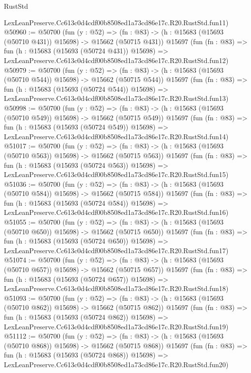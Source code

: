 \begin{lexlean}{RustStd}
\begin{coremodule}
    LexLeanPreserve.Cc613c0d4cdf00b8508ed1a73cd86e17c.R20.RustStd.fun11)
@50960 := @50700
    (fun (y : @52) =>
    (fn : @83) -> (h : @15683 (@15693 (@50710 @431)) @15698) -> @15662 (@50715 @431))
    @15697
    (fun (fn : @83) =>
    fun (h : @15683 (@15693 (@50724 @431)) @15698) =>
    LexLeanPreserve.Cc613c0d4cdf00b8508ed1a73cd86e17c.R20.RustStd.fun12)
@50979 := @50700
    (fun (y : @52) =>
    (fn : @83) -> (h : @15683 (@15693 (@50710 @544)) @15698) -> @15662 (@50715 @544))
    @15697
    (fun (fn : @83) =>
    fun (h : @15683 (@15693 (@50724 @544)) @15698) =>
    LexLeanPreserve.Cc613c0d4cdf00b8508ed1a73cd86e17c.R20.RustStd.fun13)
@50998 := @50700
    (fun (y : @52) =>
    (fn : @83) -> (h : @15683 (@15693 (@50710 @549)) @15698) -> @15662 (@50715 @549))
    @15697
    (fun (fn : @83) =>
    fun (h : @15683 (@15693 (@50724 @549)) @15698) =>
    LexLeanPreserve.Cc613c0d4cdf00b8508ed1a73cd86e17c.R20.RustStd.fun14)
@51017 := @50700
    (fun (y : @52) =>
    (fn : @83) -> (h : @15683 (@15693 (@50710 @563)) @15698) -> @15662 (@50715 @563))
    @15697
    (fun (fn : @83) =>
    fun (h : @15683 (@15693 (@50724 @563)) @15698) =>
    LexLeanPreserve.Cc613c0d4cdf00b8508ed1a73cd86e17c.R20.RustStd.fun15)
@51036 := @50700
    (fun (y : @52) =>
    (fn : @83) -> (h : @15683 (@15693 (@50710 @584)) @15698) -> @15662 (@50715 @584))
    @15697
    (fun (fn : @83) =>
    fun (h : @15683 (@15693 (@50724 @584)) @15698) =>
    LexLeanPreserve.Cc613c0d4cdf00b8508ed1a73cd86e17c.R20.RustStd.fun16)
@51055 := @50700
    (fun (y : @52) =>
    (fn : @83) -> (h : @15683 (@15693 (@50710 @650)) @15698) -> @15662 (@50715 @650))
    @15697
    (fun (fn : @83) =>
    fun (h : @15683 (@15693 (@50724 @650)) @15698) =>
    LexLeanPreserve.Cc613c0d4cdf00b8508ed1a73cd86e17c.R20.RustStd.fun17)
@51074 := @50700
    (fun (y : @52) =>
    (fn : @83) -> (h : @15683 (@15693 (@50710 @657)) @15698) -> @15662 (@50715 @657))
    @15697
    (fun (fn : @83) =>
    fun (h : @15683 (@15693 (@50724 @657)) @15698) =>
    LexLeanPreserve.Cc613c0d4cdf00b8508ed1a73cd86e17c.R20.RustStd.fun18)
@51093 := @50700
    (fun (y : @52) =>
    (fn : @83) -> (h : @15683 (@15693 (@50710 @862)) @15698) -> @15662 (@50715 @862))
    @15697
    (fun (fn : @83) =>
    fun (h : @15683 (@15693 (@50724 @862)) @15698) =>
    LexLeanPreserve.Cc613c0d4cdf00b8508ed1a73cd86e17c.R20.RustStd.fun19)
@51112 := @50700
    (fun (y : @52) =>
    (fn : @83) -> (h : @15683 (@15693 (@50710 @868)) @15698) -> @15662 (@50715 @868))
    @15697
    (fun (fn : @83) =>
    fun (h : @15683 (@15693 (@50724 @868)) @15698) =>
    LexLeanPreserve.Cc613c0d4cdf00b8508ed1a73cd86e17c.R20.RustStd.fun20)

\end{coremodule}
\end{lexlean}
